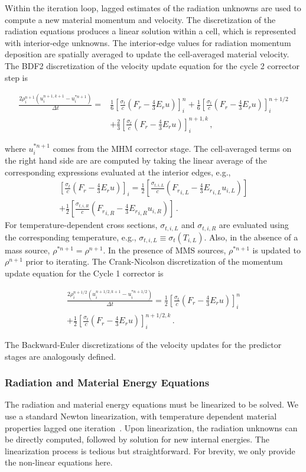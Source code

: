 \documentclass[preprint,12pt]{elsarticle}
\newcommand{\pec}{\, ,}
\newcommand{\pep}{\, .}
\newcommand{\lequ}[1]{\label{eq:#1}}
\newcommand{\half}{\frac{1}{2}}
\newcommand{\sixth}{\frac{1}{6}}
\newcommand{\E}{{E_r}}
\newcommand{\F}{{F_r}}
\newcommand{\dt}{\Delta t}
\newcommand{\iL}{_{i,L}}
\newcommand{\iR}{_{i,R}}
\newcommand{\momentumSource}{
   \left[\frac{\sigma_{t}}{c}\left(\F-\frac{4}{3}\E u\right)\right]
}
\newcommand{\momentumUpdateCN}[5]{
\begin{multline}
    \frac{#2\rho^{#4}#3\left(u^{#4,k+1}#3-u^{*#4}#3\right)}{\dt} = 
   \half\momentumSource^{#1}#3 \\
   +\half\momentumSource^{#4,k}#3
  \pep
#5
\end{multline}
}
\newcommand{\momentumUpdateBDFTwo}[6]{
\begin{equation}\begin{split}
    \frac{#3\rho^{#5}#4\left(u^{#5,k+1}#4-u^{*#5}#4\right)}{\dt} =  
  & \sixth\momentumSource^{#1}#4
   +\sixth\momentumSource^{#2}#4\\
   &+\frac{2}{3}\momentumSource^{#5,k}#4
  \pec
#6
\end{split}\end{equation}
}
\begin{document}
Within the iteration loop, lagged estimates of the radiation unknowns are used to compute a new
material momentum and velocity.  The discretization of the radiation equations produces a linear
solution within a cell, which is represented with interior-edge unknowns.  The interior-edge values for radiation momentum deposition are spatially averaged to update the cell-averaged material
velocity.  
The BDF2 discretization of the velocity update equation for the cycle 2 corrector
step is
\momentumUpdateBDFTwo{n}{n+1/2}{2}{_i}{n+1}{\lequ{hydromBDF2full}}
where $u_i^{*n+1}$ comes from the MHM corrector stage.  The cell-averaged terms on the right hand side are are computed by taking the linear
average of the corresponding expressions evaluated at the interior edges, e.g., 
\begin{multline}
   \left[\frac{\sigma_t}{c}\left(\F - \frac{4}{3}\E u\right)\right]_i =
   \half\left[\frac{\sigma_{t,i,L}}{c}\left(\F\iL - \frac{4}{3}\E\iL u\iL\right)\right]\\
   + \half\left[\frac{\sigma_{t,i,R}}{c}\left(\F\iR - \frac{4}{3}\E\iR u\iR\right)\right]
   \pep
\end{multline}
For temperature-dependent cross sections, $\sigma_{t,i,L}$ and $\sigma_{t,i,R}$ are evaluated using the corresponding
temperature, e.g., $\sigma_{t,i,L}\equiv\sigma_{t}(T_{i,L})$.  Also, in the absence of a mass source, $\rho^{*n+1}=\rho^{n+1}$. In the
presence of MMS sources, $\rho^{*n+1}$ is updated to $\rho^{n+1}$ prior to iterating.
The Crank-Nicolson discretization of the momentum update equation for the Cycle 1
corrector is
\momentumUpdateCN{n}{2}{_i}{n+1/2}{\lequ{hydromCNfull}}
The Backward-Euler discretizations of the velocity updates for the predictor stages are analogously defined.

\subsubsection{Radiation and Material Energy Equations}

The radiation and material energy equations must be linearized to be solved.  We use
a standard Newton linearization, with temperature dependent material properties lagged one
iteration~\cite{morelldsn}.  Upon linearization, the radiation unknowns can be directly
computed, followed by solution for new internal energies.  The linearization process is
tedious but straightforward.  For brevity, we only provide the non-linear equations here.
\end{document}
